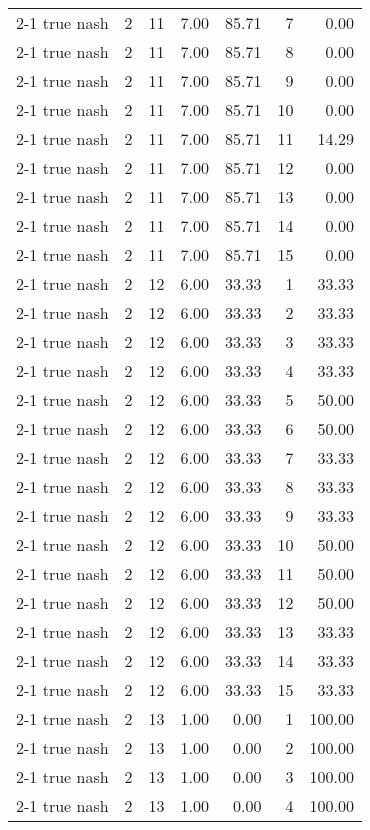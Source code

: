 \begin{tabular}{lrrrrrr}
2-1  true nash & 2 & 11 & 7.00 & 85.71 & 7 & 0.00 \\
2-1  true nash & 2 & 11 & 7.00 & 85.71 & 8 & 0.00 \\
2-1  true nash & 2 & 11 & 7.00 & 85.71 & 9 & 0.00 \\
2-1  true nash & 2 & 11 & 7.00 & 85.71 & 10 & 0.00 \\
2-1  true nash & 2 & 11 & 7.00 & 85.71 & 11 & 14.29 \\
2-1  true nash & 2 & 11 & 7.00 & 85.71 & 12 & 0.00 \\
2-1  true nash & 2 & 11 & 7.00 & 85.71 & 13 & 0.00 \\
2-1  true nash & 2 & 11 & 7.00 & 85.71 & 14 & 0.00 \\
2-1  true nash & 2 & 11 & 7.00 & 85.71 & 15 & 0.00 \\
2-1  true nash & 2 & 12 & 6.00 & 33.33 & 1 & 33.33 \\
2-1  true nash & 2 & 12 & 6.00 & 33.33 & 2 & 33.33 \\
2-1  true nash & 2 & 12 & 6.00 & 33.33 & 3 & 33.33 \\
2-1  true nash & 2 & 12 & 6.00 & 33.33 & 4 & 33.33 \\
2-1  true nash & 2 & 12 & 6.00 & 33.33 & 5 & 50.00 \\
2-1  true nash & 2 & 12 & 6.00 & 33.33 & 6 & 50.00 \\
2-1  true nash & 2 & 12 & 6.00 & 33.33 & 7 & 33.33 \\
2-1  true nash & 2 & 12 & 6.00 & 33.33 & 8 & 33.33 \\
2-1  true nash & 2 & 12 & 6.00 & 33.33 & 9 & 33.33 \\
2-1  true nash & 2 & 12 & 6.00 & 33.33 & 10 & 50.00 \\
2-1  true nash & 2 & 12 & 6.00 & 33.33 & 11 & 50.00 \\
2-1  true nash & 2 & 12 & 6.00 & 33.33 & 12 & 50.00 \\
2-1  true nash & 2 & 12 & 6.00 & 33.33 & 13 & 33.33 \\
2-1  true nash & 2 & 12 & 6.00 & 33.33 & 14 & 33.33 \\
2-1  true nash & 2 & 12 & 6.00 & 33.33 & 15 & 33.33 \\
2-1  true nash & 2 & 13 & 1.00 & 0.00 & 1 & 100.00 \\
2-1  true nash & 2 & 13 & 1.00 & 0.00 & 2 & 100.00 \\
2-1  true nash & 2 & 13 & 1.00 & 0.00 & 3 & 100.00 \\
2-1  true nash & 2 & 13 & 1.00 & 0.00 & 4 & 100.00 \\

\end{tabular}
